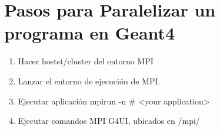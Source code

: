 \section{Pasos para Paralelizar un programa en Geant4}


\begin{enumerate}
    \item Hacer hostst/cluster del entorno MPI 
    \item Lanzar el entorno de ejecución de MPI.
    \item Ejecutar aplicación mpirun -n # <your application>
    \item Ejecutar comandos MPI G4UI, ubicados en /mpi/
    
\end{enumerate}


\newpage
